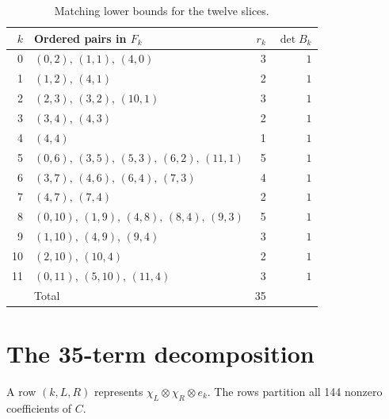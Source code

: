 \documentclass[11pt,a4paper]{article}
\theoremstyle{definition}
\begin{document}
\begin{table}[ht]
\centering
\small
\setlength{\tabcolsep}{6pt}
\renewcommand{\arraystretch}{1.2}
\begin{tabular}{r l r r}
\toprule
$k$ & Ordered pairs in $F_k$ & $r_k$ & $\det B_k$\\
\midrule
0 & $(0,2),\,(1,1),\,(4,0)$ & 3 & $1$ \\
1 & $(1,2),\,(4,1)$ & 2 & $1$ \\
2 & $(2,3),\,(3,2),\,(10,1)$ & 3 & $1$ \\
3 & $(3,4),\,(4,3)$ & 2 & $1$ \\
4 & $(4,4)$ & 1 & $1$ \\
5 & $(0,6),\,(3,5),\,(5,3),\,(6,2),\,(11,1)$ & 5 & $1$ \\
6 & $(3,7),\,(4,6),\,(6,4),\,(7,3)$ & 4 & $1$ \\
7 & $(4,7),\,(7,4)$ & 2 & $1$ \\
8 & $(0,10),\,(1,9),\,(4,8),\,(8,4),\,(9,3)$ & 5 & $1$ \\
9 & $(1,10),\,(4,9),\,(9,4)$ & 3 & $1$ \\
10 & $(2,10),\,(10,4)$ & 2 & $1$ \\
11 & $(0,11),\,(5,10),\,(11,4)$ & 3 & $1$ \\
\midrule
 & Total & 35 & \\
\bottomrule
\end{tabular}
\caption{Matching lower bounds for the twelve slices.}\label{tab:witnesses}
\end{table}

\clearpage
\section{The 35-term decomposition}\label{app:upper}

A row $(k,L,R)$ represents $\chi_L\otimes\chi_R\otimes e_k$.
The rows partition all 144 nonzero coefficients of $C$.
\end{document}
